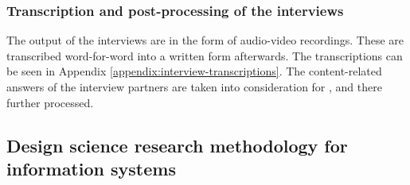 \subsubsection{Transcription and post-processing of the interviews}

The output of the interviews are in the form of audio-video recordings.
These are transcribed word-for-word into a written form afterwards.
The transcriptions can be seen in Appendix \ref{appendix:interview-transcriptions}.
The content-related answers of the interview partners are taken into consideration
for , and there further processed.





\subsection{Design science research methodology for information systems}












%

